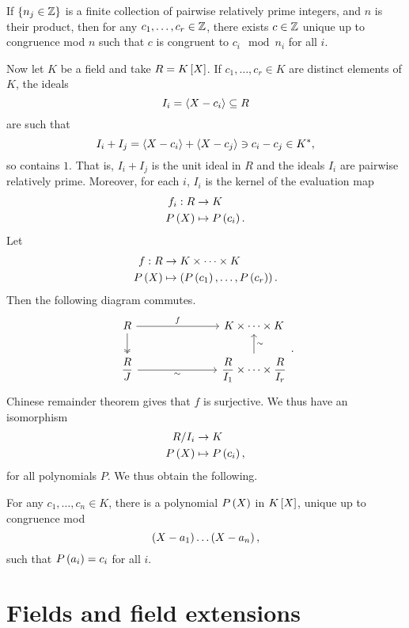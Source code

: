 \begin{theorem}
If $ \cb{n_j \in \Z} $ is a finite collection of pairwise relatively prime integers, and $ n $ is their product, then for any $ c_1, \dots, c_r \in \Z $, there exists $ c \in \Z $ unique up to congruence mod $ n $ such that $ c $ is congruent to $ c_i \mod n_i $ for all $ i $.
\end{theorem}

Now let $ K $ be a field and take $ R = K\sb{X} $. If $ c_1, \dots, c_r \in K $ are distinct elements of $ K $, the ideals
$$ I_i = \ab{X - c_i} \subseteq R $$
are such that
$$ I_i + I_j = \ab{X - c_i} + \ab{X - c_j} \ni c_i - c_j \in K^*, $$
so contains $ 1 $. That is, $ I_i + I_j $ is the unit ideal in $ R $ and the ideals $ I_i $ are pairwise relatively prime. Moreover, for each $ i $, $ I_i $ is the kernel of the evaluation map
\begin{align*}
f_i : R & \to K \\
P\rb{X} & \mapsto P\rb{c_i}.
\end{align*}
Let
\begin{align*}
f : R & \to K \times \dots \times K \\
P\rb{X} & \mapsto \rb{P\rb{c_1}, \dots, P\rb{c_r}}.
\end{align*}
Then the following diagram commutes.
$$
\begin{tikzcd}[column sep=1in]
R \arrow{r}{f} \arrow[twoheadrightarrow]{d} & K \times \dots \times K \\
\dfrac{R}{J} \arrow[swap]{r}{\sim} & \dfrac{R}{I_1} \times \dots \times \dfrac{R}{I_r} \arrow[swap]{u}{\sim}
\end{tikzcd}.
$$
Chinese remainder theorem gives that $ f $ is surjective. We thus have an isomorphism
\begin{align*}
R / I_i & \to K \\
P\rb{X} & \mapsto P\rb{c_i},
\end{align*}
for all polynomials $ P $. We thus obtain the following.

\begin{theorem}
For any $ c_1, \dots, c_n \in K $, there is a polynomial $ P\rb{X} $ in $ K\sb{X} $, unique up to congruence mod
$$ \rb{X - a_1} \dots \rb{X - a_n}, $$
such that $ P\rb{a_i} = c_i $ for all $ i $.
\end{theorem}

\pagebreak


\section{Fields and field extensions}

